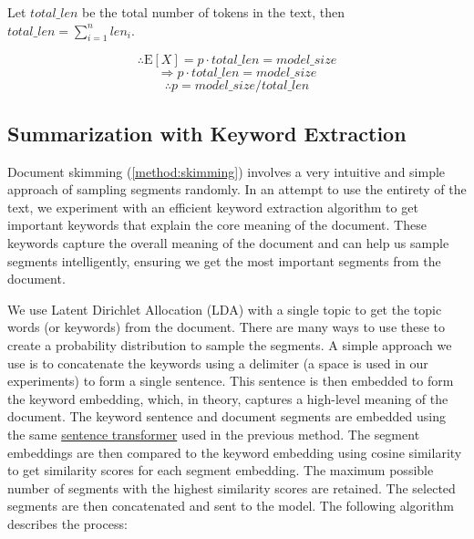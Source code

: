 			Let $total\_len$ be the total number of tokens in the text, then
			$total\_len = \sum_{i = 1}^{n} len_i$.

			\[ \therefore \mathrm{E}[X] = p \cdot total\_len = model\_size \]
			\[ \Rightarrow p \cdot total\_len = model\_size \]
			\[ \therefore p = model\_size / total\_len \]


	\subsection{Summarization with Keyword Extraction}
		\label{method:keyword}

		Document skimming (\autoref{method:skimming}) involves a very intuitive and simple approach of
		sampling segments randomly.
		In an attempt to use the entirety of the text, we experiment with an efficient keyword extraction
		algorithm to get important keywords that explain the core meaning of the document.
		These keywords capture the overall meaning of the document and can help us sample segments
		intelligently, ensuring we get the most important segments from the document.

		We use Latent Dirichlet Allocation (LDA) \cite{blei2003latent} with a single topic to get the
		topic words (or keywords) from the document.
		There are many ways to use these to create a probability distribution to sample the segments.
		A simple approach we use is to concatenate the keywords using a delimiter (a space is used in our
		experiments) to form a single sentence.
		This sentence is then embedded to form the keyword embedding, which, in theory, captures a
		high-level meaning of the document.
		The keyword sentence and document segments are embedded using the same
		\href{https://huggingface.co/sentence-transformers/all-MiniLM-L6-v2}{sentence transformer}
		used in the previous method.
		The segment embeddings are then compared to the keyword embedding using cosine similarity
		to get similarity scores for each segment embedding.
		The maximum possible number of segments with the highest similarity scores are retained.
		The selected segments are then concatenated and sent to the model.
		The following algorithm describes the process:

